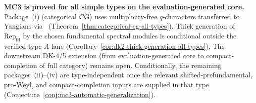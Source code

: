 \begin{remark}
\begin{itemize}
\begin{construction}
\label{constr:mc3-difficulty-gradient-concordance}
\textbf{MC3 is proved for all simple types on the
evaluation-generated core.}
Package~(i) (categorical CG) uses multiplicity-free
$q$-characters \cite{FrenkelMukhin01, Nakajima04, ChariMoura06}
transferred to Yangians via~\cite{GTL17}
(Theorem~\ref{thm:categorical-cg-all-types}).
Thick generation of $\mathrm{Rep}_{\mathrm{fd}}$ by the chosen
fundamental spectral modules is conditional outside the verified
type-$A$ lane
(Corollary~\ref{cor:dk2-thick-generation-all-types}).
The downstream DK-4/5 extension (from evaluation-generated core
to compact-completion of full category) remains open.
Conditionally, the remaining packages~(ii)--(iv) are
type-independent once the relevant shifted-prefundamental,
pro-Weyl, and compact-completion inputs are supplied in that
type (Conjecture~\ref{conj:mc3-automatic-generalization}).
\end{construction}


\end{itemize}
\end{remark}
